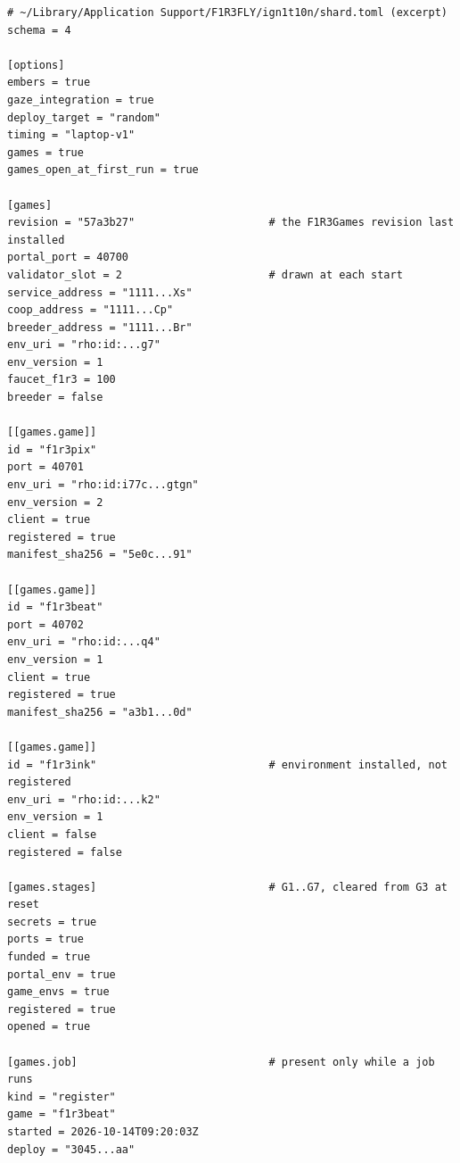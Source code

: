\documentclass[11pt]{article}
\theoremstyle{definition}
\theoremstyle{remark}
\begin{document}
\begin{lstlisting}[language=Conf]
# ~/Library/Application Support/F1R3FLY/ign1t10n/shard.toml (excerpt)
schema = 4

[options]
embers = true
gaze_integration = true
deploy_target = "random"
timing = "laptop-v1"
games = true
games_open_at_first_run = true

[games]
revision = "57a3b27"                     # the F1R3Games revision last installed
portal_port = 40700
validator_slot = 2                       # drawn at each start
service_address = "1111...Xs"
coop_address = "1111...Cp"
breeder_address = "1111...Br"
env_uri = "rho:id:...g7"
env_version = 1
faucet_f1r3 = 100
breeder = false

[[games.game]]
id = "f1r3pix"
port = 40701
env_uri = "rho:id:i77c...gtgn"
env_version = 2
client = true
registered = true
manifest_sha256 = "5e0c...91"

[[games.game]]
id = "f1r3beat"
port = 40702
env_uri = "rho:id:...q4"
env_version = 1
client = true
registered = true
manifest_sha256 = "a3b1...0d"

[[games.game]]
id = "f1r3ink"                           # environment installed, not registered
env_uri = "rho:id:...k2"
env_version = 1
client = false
registered = false

[games.stages]                           # G1..G7, cleared from G3 at reset
secrets = true
ports = true
funded = true
portal_env = true
game_envs = true
registered = true
opened = true

[games.job]                              # present only while a job runs
kind = "register"
game = "f1r3beat"
started = 2026-10-14T09:20:03Z
deploy = "3045...aa"
\end{lstlisting}
\end{document}
